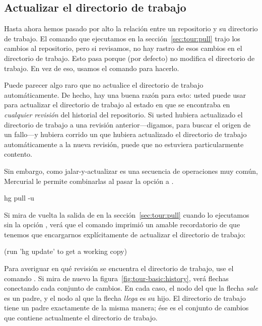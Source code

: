 \subsection{Actualizar el directorio de trabajo}

Hasta ahora hemos pasado por alto la relación entre un repositorio y
su directorio de trabajo. El comando  que ejecutamos en la
sección~\ref{sec:tour:pull} trajo los cambios al repositorio, pero si
revisamos, no hay rastro de esos cambios en el directorio de trabajo.
Esto pasa porque  (por defecto) no modifica el directorio de
trabajo. En vez de eso, usamos el comando
 para hacerlo.

Puede parecer algo raro que  no actualice el directorio de
trabajo automáticamente. De hecho, hay una buena razón para esto:
usted puede usar  para actualizar el directorio de
trabajo al estado en que se encontraba en \emph{cualquier revisión}
del historial del repositorio. Si usted hubiera actualizado el
directorio de trabajo a una revisión anterior---digamos, para buscar
el origen de un fallo---y hubiera corrido un  que hubiera
actualizado el directorio de trabajo automáticamente a la nueva
revisión, puede que no estuviera particularmente contento.

Sin embargo, como jalar-y-actualizar es una secuencia de operaciones
muy común, Mercurial le permite combinarlas al pasar la opción
a .
\begin{codesample2}
  hg pull -u
\end{codesample2}
Si mira de vuelta la salida de  en la
sección~\ref{sec:tour:pull} cuando lo ejecutamos sin la opción ,
verá que el comando imprimió un amable recordatorio de que tenemos que
encargarnos explícitamente de actualizar el directorio de trabajo:
\begin{codesample2}
  (run 'hg update' to get a working copy)
\end{codesample2}

Para averiguar en qué revisión se encuentra el directorio de trabajo,
use el comando .
Si mira de nuevo la figura~\ref{fig:tour-basic:history}, verá flechas
conectando cada conjunto de cambios. En cada caso, el nodo del que la flecha
\emph{sale} es un padre, y el nodo al que la flecha \emph{llega} es 
su hijo. El directorio de trabajo tiene un padre exactamente de la
misma manera; ése es el conjunto de cambios que contiene actualmente
el directorio de trabajo.

